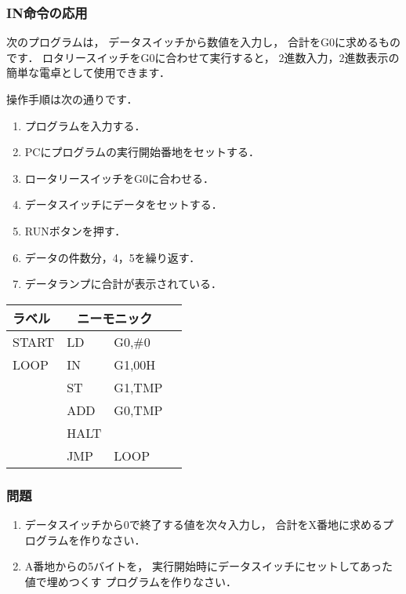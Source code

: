 \subsubsection{IN命令の応用}
次のプログラムは，
データスイッチから数値を入力し，
合計をG0に求めるものです．
ロタリースイッチをG0に合わせて実行すると，
2進数入力，2進数表示の簡単な電卓として使用できます．

操作手順は次の通りです．

\begin{enumerate}
\item プログラムを入力する．
\item PCにプログラムの実行開始番地をセットする．
\item ロータリースイッチをG0に合わせる．
\item データスイッチにデータをセットする．
\item RUNボタンを押す．
\item データの件数分，4，5を繰り返す．
\item データランプに合計が表示されている．
\end{enumerate}

{\tt\small\begin{center}
\begin{tabular}{|l|l l|l}
\cline{1-3}
ラベル & \multicolumn{2}{|c|}{ニーモニック} \\
\hline
START & LD   & G0,\#0        \\
LOOP  & IN   & G1,00H        \\
      & ST   & G1,TMP        \\
      & ADD  & G0,TMP        \\
      & HALT &               \\
      & JMP  & LOOP          \\ 
\hline
\end{tabular}
\end{center}}

\vfill
\subsubsection{問題}
\begin{enumerate}
\item データスイッチから0で終了する値を次々入力し，
合計をX番地に求めるプログラムを作りなさい．
\item A番地からの5バイトを，
実行開始時にデータスイッチにセットしてあった値で埋めつくす
プログラムを作りなさい．
\end{enumerate}
\vfill


